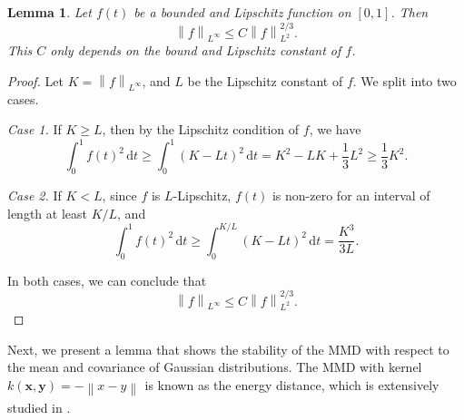 \documentclass{article} %
\theoremstyle{plain}
\newtheorem{lemma}[theorem]{Lemma}
\theoremstyle{definition}
\theoremstyle{remark}
\newcommand{\norm}[2][H^s]{\left\|#2\right\|_{#1}}
\newcommand{\bx}{\mathbf{x}}
\newcommand{\by}{\mathbf{y}}
\newcommand{\rd}{\mathrm{d}}
\begin{document}
\begin{lemma}\label{lem:norm2infty}
Let $f(t)$ be a bounded and Lipschitz function on $[0,1]$. Then 
$$\norm[L^\infty]{f} \le C \norm[L^2]{f}^{2/3}.$$
This $C$ only depends on the bound and Lipschitz constant of $f$.
\end{lemma}

\begin{proof}
Let $K = \norm[L^\infty]{f}$, and $L$ be the Lipschitz constant of $f$. We split into two cases.

\emph{Case 1.} If $K \ge L$, then by the Lipschitz condition of $f$, we have
$$\int_0^1 f(t)^2 \,\rd t \ge \int_0^1 (K-Lt)^2 \,\rd t = K^2 - LK + \frac13 L^2 \ge \frac13 K^2.$$

\emph{Case 2.} If $K < L$, since $f$ is $L$-Lipschitz, $f(t)$ is non-zero for an interval of length at least $K/L$, and
$$\int_0^1 f(t)^2 \,\rd t  \ge \int_0^{K/L} (K-Lt)^2 \,\rd t = \dfrac{K^3}{3L}.$$

In both cases, we can conclude that
$$\norm[L^\infty]{f} \le C \norm[L^2]{f}^{2/3}.$$
\end{proof}

Next, we present a lemma that shows the stability of the MMD with respect to the mean and covariance of Gaussian distributions. The MMD with kernel $k(\bx,\by) = - \norm[]{x-y}$ is known as the energy distance, which is extensively studied in \cite{szekely2013energy,rizzo2016energy}.
\end{document}

